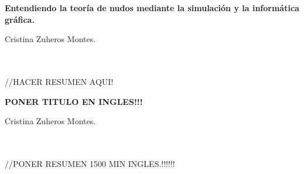 
\cleardoublepage
\thispagestyle{empty}

\begin{center}
{\large\bfseries Entendiendo la teoría de nudos mediante la simulación y la informática gráfica.}\\
\end{center}
\begin{center}
Cristina Zuheros Montes.\\
\end{center}

\\

\vspace{0.7cm}
\\

//HACER RESUMEN AQUI!
 
\cleardoublepage


\thispagestyle{empty}

\begin{center}
{\large\bfseries PONER TITULO EN INGLES!!!}\\
\end{center}
\begin{center}
Cristina Zuheros Montes.\\
\end{center}

\\

\vspace{0.7cm}
\\

//PONER RESUMEN 1500 MIN INGLES.!!!!!!\\




